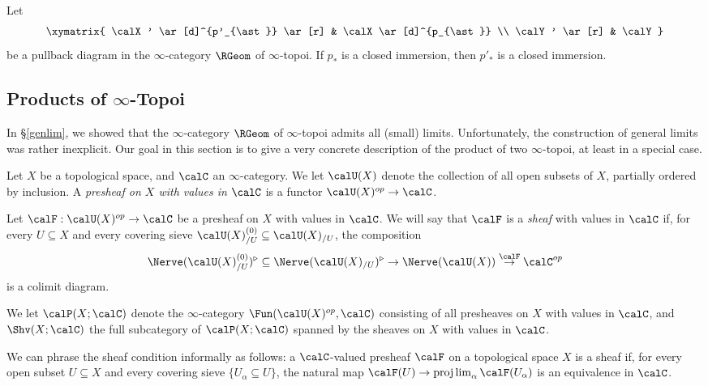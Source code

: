 \begin{corollary}
Let $$ \xymatrix{ \calX' \ar[d]^{p'_{\ast}} \ar[r] & \calX \ar[d]^{p_{\ast}} \\
\calY' \ar[r] & \calY }$$
be a pullback diagram in the $\infty$-category $\RGeom$ of $\infty$-topoi. If
$p_{\ast}$ is a closed immersion, then $p'_{\ast}$ is a closed immersion.
\end{corollary}

\subsection{Products of $\infty$-Topoi}\label{products}

In \S \ref{genlim}, we showed that the $\infty$-category $\RGeom$ of $\infty$-topoi admits all
(small) limits. Unfortunately, the construction of general limits was rather inexplicit. Our goal in this section is to give a very concrete description of the product of two $\infty$-topoi, at least in a special case.

\begin{definition}\label{valsheaf}
Let $X$ be a topological space, and $\calC$ an $\infty$-category. We let
$\calU(X)$ denote the collection of all open subsets of $X$, partially ordered by inclusion.
A {\it presheaf on $X$ with values in $\calC$} is a functor
$\calU(X)^{op} \rightarrow \calC$. 

Let $\calF: \calU(X)^{op} \rightarrow \calC$ be a presheaf on $X$ with values in $\calC$. We will say that $\calF$ is a {\it sheaf} with values in $\calC$ if, for every $U \subseteq X$ and every
covering sieve $\calU(X)_{/U}^{(0)} \subseteq \calU(X)_{/U}$, the composition
$$ \Nerve(\calU(X)_{/U}^{(0)})^{\triangleright}
\subseteq \Nerve(\calU(X)_{/U})^{\triangleright} \rightarrow
\Nerve(\calU(X)) \stackrel{\calF}{\rightarrow} \calC^{op}$$
is a colimit diagram.

We let $\calP(X; \calC)$ denote the $\infty$-category
$\Fun( \calU(X)^{op}, \calC)$ consisting of all presheaves on $X$ with values in $\calC$, and
$\Shv(X;\calC)$ the full subcategory of $\calP(X;\calC)$ spanned by the sheaves on
$X$ with values in $\calC$.
\end{definition}

\begin{remark}
We can phrase the sheaf condition informally as follows: a $\calC$-valued presheaf $\calF$ on
a topological space $X$ is a sheaf if, for every open subset $U \subseteq X$ and every
covering sieve $\{ U_{\alpha} \subseteq U \}$, the natural map
$\calF(U) \rightarrow \projlim_{\alpha} \calF(U_{\alpha})$
is an equivalence in $\calC$.
\end{remark}

